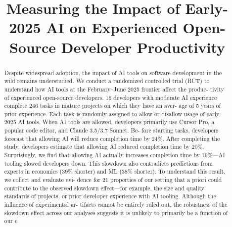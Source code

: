 \title{Measuring the Impact of Early-2025 AI on Experienced Open-Source Developer Productivity}

\maketitle

\begin{abstract}
Despite widespread adoption, the impact of AI tools on software development in the wild remains understudied. We conduct a randomized controlled trial (RCT) to understand how AI tools at the February–June 2025 frontier affect the produc- tivity of experienced open-source developers. 16 developers with moderate AI experience complete 246 tasks in mature projects on which they have an aver- age of 5 years of prior experience. Each task is randomly assigned to allow or disallow usage of early-2025 AI tools. When AI tools are allowed, developers primarily use Cursor Pro, a popular code editor, and Claude 3.5/3.7 Sonnet. Be- fore starting tasks, developers forecast that allowing AI will reduce completion time by 24\%. After completing the study, developers estimate that allowing AI reduced completion time by 20\%. Surprisingly, we find that allowing AI actually increases completion time by 19\%—AI tooling slowed developers down. This slowdown also contradicts predictions from experts in economics (39\% shorter) and ML (38\% shorter). To understand this result, we collect and evaluate evi- dence for 21 properties of our setting that a priori could contribute to the observed slowdown effect—for example, the size and quality standards of projects, or prior developer experience with AI tooling. Although the influence of experimental ar- tifacts cannot be entirely ruled out, the robustness of the slowdown effect across our analyses suggests it is unlikely to primarily be a function of our e
\end{abstract}

